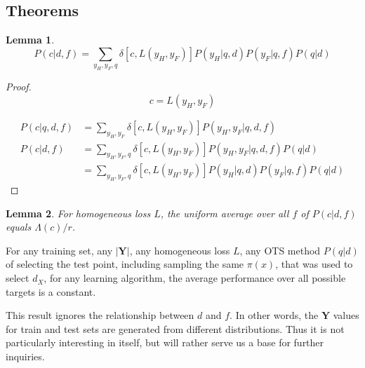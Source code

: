 \documentclass[a4paper]{article}
\newtheorem{lemma}{Lemma}
\begin{document}
\subsection{Theorems}

\begin{lemma}
\begin{equation}
  P(c|d,f) = \sum_{y_H,y_F,q}\delta\left[c,L\left(y_H, y_F\right)\right] P\left(y_H|q, d\right)
  P\left(y_F| q, f\right)P\left(q|d\right)
\end{equation}
\label{lm:Pcdf}
\end{lemma}

\begin{proof}
\begin{equation}
  c = L\left(y_H, y_F\right)
\end{equation}

\begin{equation}
\begin{split}
  P\left(c|q,d,f\right)& = \sum_{y_H,y_F} \delta\left[c,L\left(y_H,
      y_F\right)\right] P\left(y_H, y_F| q,d,f\right) \\
  P\left(c|d,f\right) & = \sum_{y_H,y_F,q} \delta\left[c,L\left(y_H,
      y_F\right)\right] P\left(y_H, y_F|q, d,f\right) P\left(q|d\right) \\
  & = \sum_{y_H,y_F,q} \delta\left[c,L\left(y_H, y_F\right)\right]
  P\left(y_H|q,d\right) P\left(y_F|q,f\right) P\left(q|d\right)
\end{split}
\end{equation}
\end{proof}

\begin{lemma}
  For homogeneous loss $L$, the uniform average over all $f$ of
  $P\left(c|d,f\right)$ equals $\Lambda\left(c\right)/r$.
  \label{th:Pcdf}
\end{lemma}

For any training set, any $\left|\mathbf{Y}\right|$, any homogeneous
loss $L$, any OTS method $P(q|d)$ of selecting the test point,
including sampling the same $\pi(x)$, that was used to select $d_X$,
for any learning algorithm, the average performance over all possible
targets is a constant.

This result ignores the relationship between $d$ and $f$. In other
words, the $\mathbf{Y}$ values for train and test sets are generated
from different distributions. Thus it is not particularly interesting
in itself, but will rather serve us a base for further inquiries.
\end{document}
